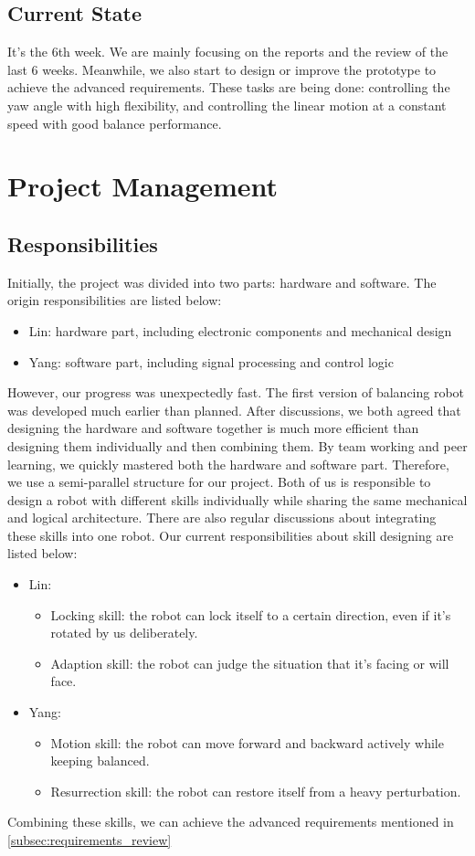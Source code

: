 \documentclass[9pt,a4paper,twocolumn]{tau-class/tau}
\begin{document}
\subsection{Current State}
It's the 6th week. We are mainly focusing on the reports and the review of the last 6 weeks. Meanwhile, we also start to design or improve the prototype to achieve the advanced requirements. These tasks are being done: controlling the yaw angle with high flexibility, and controlling the linear motion at a constant speed with good balance performance. 

\section{Project Management}

\subsection{Responsibilities}
Initially, the project was divided into two parts: hardware and software. The origin responsibilities are listed below:
\begin{itemize}
  \item Lin: hardware part, including electronic components and mechanical design
  \item Yang: software part, including signal processing and control logic
\end{itemize}
However, our progress was unexpectedly fast. The first version of balancing robot was developed much earlier than planned. After discussions, we both agreed that designing the hardware and software together is much more efficient than designing them individually and then combining them. By team working and peer learning, we quickly mastered both the hardware and software part. Therefore, we use a semi-parallel structure for our project. Both of us is responsible to design a robot with different skills individually while sharing the same mechanical and logical architecture. There are also regular discussions about integrating these skills into one robot. Our current responsibilities about skill designing are listed below: 
\begin{itemize}
  \item Lin:\begin{itemize}
    \item Locking skill: the robot can lock itself to a certain direction, even if it's rotated by us deliberately.
    \item Adaption skill: the robot can judge the situation that it's facing or will face.
  \end{itemize}
  \item Yang:\begin{itemize}
    \item Motion skill: the robot can move forward and backward actively while keeping balanced.
    \item Resurrection skill: the robot can restore itself from a heavy perturbation.
  \end{itemize}
\end{itemize}
Combining these skills, we can achieve the advanced requirements mentioned in \ref{subsec:requirements_review}
\end{document}
